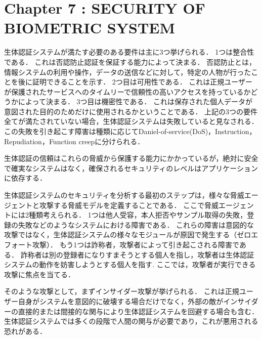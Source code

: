 \section{Chapter 7 : SECURITY OF BIOMETRIC SYSTEM}
生体認証システムが満たす必要のある要件は主に3つ挙げられる．
1つは整合性である．
これは否認防止認証を保証する能力によって決まる．
否認防止とは，情報システムの利用や操作，データの送信などに対して，特定の人物が行ったことを後に証明できることを示す．
2つ目は可用性である．
これは正規ユーザーが保護されたサービスへのタイムリーで信頼性の高いアクセスを持っているかどうかによって決まる．
3つ目は機密性である．
これは保存された個人データが意図された目的のためだけに使用されるかということである．
上記の3つの要件全てが満たされていない場合，生体認証システムは失敗していると見なされる．
この失敗を引き起こす障害は種類に応じてDaniel-of-service(DoS)，Instruction，Repudiation，Function creepに分けられる．

生体認証の信頼はこれらの脅威から保護する能力にかかっているが，絶対に安全で確実なシステムはなく，確保されるセキュリティのレベルはアプリケーションに依存する．

生体認証システムのセキュリティを分析する最初のステップは，様々な脅威エージェントと攻撃する脅威モデルを定義することである．
ここで脅威エージェントには2種類考えられる．
1つは他人受容，本人拒否やサンプル取得の失敗，登録の失敗などのようなシステムにおける障害である．
これらの障害は意図的な攻撃ではなく，生体認証システムの様々なモジュールが原因で発生する（ゼロエフォート攻撃）．
もう1つは詐称者，攻撃者によって引き起こされる障害である．
詐称者は別の登録者になりすまそうとする個人を指し，攻撃者は生体認証システムの動作を妨害しようとする個人を指す.
ここでは，攻撃者が実行できる攻撃に焦点を当てる．

そのような攻撃として，まずインサイダー攻撃が挙げられる．
これは正規ユーザー自身がシステムを意図的に破壊する場合だけでなく，外部の敵がインサイダーの直接的または間接的な関与により生体認証システムを回避する場合も含む．
生体認証システムでは多くの段階で人間の関与が必要であり，これが悪用される恐れがある．

